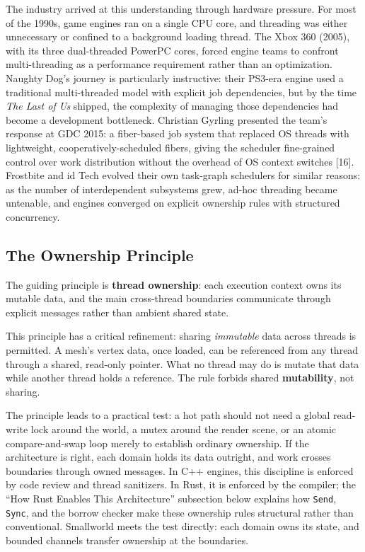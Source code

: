 \documentclass[
  11pt,
  letterpaper,
  DIV=11,
  numbers=noendperiod,
  twoside,
  open=right]{scrreprt}
\begin{document}
The industry arrived at this understanding through hardware pressure.
For most of the 1990s, game engines ran on a single CPU core, and
threading was either unnecessary or confined to a background loading
thread. The Xbox 360 (2005), with its three dual-threaded PowerPC cores,
forced engine teams to confront multi-threading as a performance
requirement rather than an optimization. Naughty Dog's journey is
particularly instructive: their PS3-era engine used a traditional
multi-threaded model with explicit job dependencies, but by the time
\emph{The Last of Us} shipped, the complexity of managing those
dependencies had become a development bottleneck. Christian Gyrling
presented the team's response at GDC 2015: a fiber-based job system that
replaced OS threads with lightweight, cooperatively-scheduled fibers,
giving the scheduler fine-grained control over work distribution without
the overhead of OS context switches {[}16{]}. Frostbite and id Tech
evolved their own task-graph schedulers for similar reasons: as the
number of interdependent subsystems grew, ad-hoc threading became
untenable, and engines converged on explicit ownership rules with
structured concurrency.

\subsection{The Ownership Principle}\label{the-ownership-principle}

The guiding principle is \textbf{thread ownership}: each execution
context owns its mutable data, and the main cross-thread boundaries
communicate through explicit messages rather than ambient shared state.

This principle has a critical refinement: sharing \emph{immutable} data
across threads is permitted. A mesh's vertex data, once loaded, can be
referenced from any thread through a shared, read-only pointer. What no
thread may do is mutate that data while another thread holds a
reference. The rule forbids shared \textbf{mutability}, not sharing.

The principle leads to a practical test: a hot path should not need a
global read-write lock around the world, a mutex around the render
scene, or an atomic compare-and-swap loop merely to establish ordinary
ownership. If the architecture is right, each domain holds its data
outright, and work crosses boundaries through owned messages. In C++
engines, this discipline is enforced by code review and thread
sanitizers. In Rust, it is enforced by the compiler; the ``How Rust
Enables This Architecture'' subsection below explains how \texttt{Send},
\texttt{Sync}, and the borrow checker make these ownership rules
structural rather than conventional. Smallworld meets the test directly:
each domain owns its state, and bounded channels transfer ownership at
the boundaries.
\end{document}
